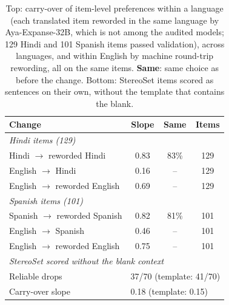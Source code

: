 \begin{table}[t]
\centering
\small
\setlength{\tabcolsep}{1.6pt}
\begin{tabular}{lccc}
\toprule
\textbf{Change} & \textbf{Slope} & \textbf{Same} & \textbf{Items} \\
\midrule
\multicolumn{4}{l}{\emph{Hindi items (129)}} \\
\quad Hindi $\rightarrow$ reworded Hindi & 0.83 & 83\% & 129 \\
\quad English $\rightarrow$ Hindi & 0.16 & -- & 129 \\
\quad English $\rightarrow$ reworded English & 0.69 & -- & 129 \\
\multicolumn{4}{l}{\emph{Spanish items (101)}} \\
\quad Spanish $\rightarrow$ reworded Spanish & 0.82 & 81\% & 101 \\
\quad English $\rightarrow$ Spanish & 0.46 & -- & 101 \\
\quad English $\rightarrow$ reworded English & 0.75 & -- & 101 \\
\midrule
\multicolumn{4}{l}{\emph{StereoSet scored without the blank context}} \\
Reliable drops & \multicolumn{3}{l}{37/70 (template: 41/70)} \\
Carry-over slope & \multicolumn{3}{l}{0.18 (template: 0.15)} \\
\bottomrule
\end{tabular}
\caption{Top: carry-over of item-level preferences within a language (each translated item reworded in the same language by Aya-Expanse-32B, which is not among the audited models; 129 Hindi and 101 Spanish items passed validation), across languages, and within English by machine round-trip rewording, all on the same items. \textbf{Same}: same choice as before the change. Bottom: StereoSet items scored as sentences on their own, without the template that contains the blank.}
\label{tab:within_language}
\end{table}
